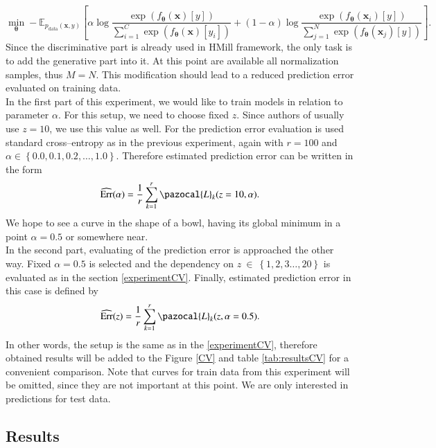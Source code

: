 \begin{equation}
	\min_{\boldsymbol{\theta}}- \mathbb{E}_{p_{\mathrm{data}}(\boldsymbol{x},y)}\left[\alpha\log \frac{\exp\left({f_{\boldsymbol{\theta}}\left(\boldsymbol{x}\right)[y]}\right)}{\sum_{i=1}^C\exp\left({f_{\boldsymbol{\theta}}\left(\boldsymbol{x}\right)[y_i]}\right)}+ \left(1-\alpha\right)\log \frac{\exp\left({f_{\boldsymbol{\theta}}\left(\boldsymbol{x}_i\right)[y]}\right)}{\sum_{j=1}^N\exp\left({f_{\boldsymbol{\theta}}\left(\boldsymbol{x}_j\right)[y]}\right)} \right].
	\end{equation}
Since the discriminative part is already used in HMill framework, the only task is to add the generative part into it. At this point are available all normalization samples, thus $M=N$. This modification should lead to a reduced prediction error evaluated on training data.\\
In the first part of this experiment, we would like to train models in relation to parameter $\alpha$. For this setup, we need to choose fixed $z$. Since authors of \cite{mandlik} usually use $z=10$, we use this value as well. For the prediction error evaluation is used standard cross--entropy as in the previous experiment, again with $r=100$ and $\alpha \in \left\{0.0, 0.1, 0.2,\dots,1.0\right\}$. Therefore estimated prediction error can be written in the form
\begin{equation}
	\widehat{\mathrm{Err}}(\alpha) = \frac{1}{r}\sum_{k=1}^r \pazocal{L}_k(z=10, \alpha).
\end{equation}
We hope to see a curve in the shape of a bowl, having its global minimum in a point $\alpha=0.5$ or somewhere near.\\ 
In the second part, evaluating of the prediction error is approached the other way. Fixed $\alpha = 0.5$ is selected and the dependency on $z~\in~\left\{1,2,3\dots,20 \right\}$ is evaluated as in the section \ref{experimentCV}. Finally, estimated prediction error in this case is defined by
\begin{equation}
	\widehat{\mathrm{Err}}(z) = \frac{1}{r}\sum_{k=1}^r \pazocal{L}_k(z, \alpha =0.5).
\end{equation}
In other words, the setup is the same as in the \ref{experimentCV}, therefore obtained results will be added to the Figure \ref{CV} and table \ref{tab:resultsCV} for a convenient comparison. Note that curves for train data from this experiment will be omitted, since they are not important at this point. We are only interested in predictions for test data.  
\clearpage
\subsection{Results}



